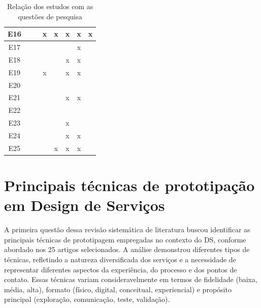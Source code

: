 \begin{table}[H]
\begin{tabular}{|c|c|c|c|c|c|c|c|}
		E16 & \cite{lee2022how} & \checkmark & x & x & x & x & x\\ \hline
		E17 & \cite{quintero2021interdisciplinary} & \checkmark & \checkmark & \checkmark & \checkmark & x & \checkmark \\ \hline
		E18 & \cite{iriarte2023service} & \checkmark & \checkmark & \checkmark & x & x & \checkmark \\ \hline
		E19 & \cite{leinonen2023service} & \checkmark & x & \checkmark & x & x & \checkmark\\ \hline
		E20 & \cite{mager2023product} & \checkmark & \checkmark & \checkmark & \checkmark & \checkmark & \checkmark\\ \hline
		E21 & \cite{nguyen2022human} & \checkmark & \checkmark & \checkmark & x & x & \checkmark\\ \hline
		E22 & \cite{paust2025integrative} & \checkmark & \checkmark & \checkmark & \checkmark & \checkmark & \checkmark\\ \hline
		E23 & \cite{Vieira2025} & \checkmark & \checkmark & \checkmark & x & \checkmark & \checkmark\\ \hline
		E24 & \cite{schlott2024design} & \checkmark & \checkmark & \checkmark & x & x & \checkmark\\ \hline
		E25 & \cite{you2022applying} & \checkmark & \checkmark & x & x & x & \checkmark \\ \hline

	\end{tabular}
	\caption{Relação dos estudos com as questões de pesquisa}
\end{table}



\section{Principais técnicas de prototipação em Design de Serviços}

A primeira questão dessa revisão sistemática de literatura buscou identificar as principais técnicas de prototipagem empregadas no contexto do DS, conforme abordado nos 25 artigos selecionados. A análise demonstrou diferentes tipos de técnicas, refletindo a natureza diversificada dos serviços e a necessidade de representar diferentes aspectos da experiência, do processo e dos pontos de contato. Essas técnicas variam consideravelmente em termos de fidelidade (baixa, média, alta), formato (físico, digital, conceitual, experiencial) e propósito principal (exploração, comunicação, teste, validação).

